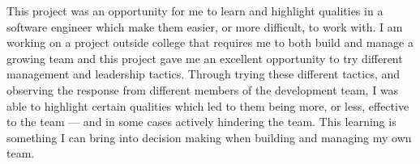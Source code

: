\documentclass{article}
\begin{document}
    This project was an opportunity for me to learn and highlight qualities in a software engineer which make them easier, or more difficult, to work with. I am working on a project outside college that requires me to both build and manage a growing team and this project gave me an excellent opportunity to try different management and leadership tactics. Through trying these different tactics, and observing the response from different members of the development team, I was able to highlight certain qualities which led to them being more, or less, effective to the team — and in some cases actively hindering the team. This learning is something I can bring into decision making when building and managing my own team.
\end{document}
